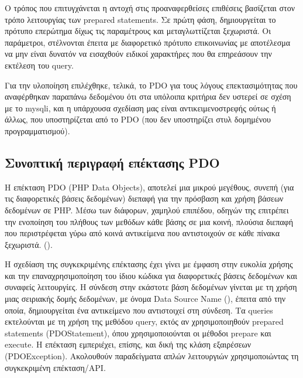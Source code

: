 \documentclass[diploma]{softlab-thesis}
\begin{document}
\bigskip

Ο τρόπος που επιτυγχάνεται η αντοχή στις προαναφερθείσες επιθέσεις βασίζεται
στον τρόπο λειτουργίας των prepared statements. Σε πρώτη φάση, δημιουργείται το
πρότυπο επερώτημα δίχως τις παραμέτρους και μεταγλωττίζεται ξεχωριστά. Οι
παράμετροι, στέλνονται έπειτα με διαφορετικό πρότυπο επικοινωνίας με
αποτέλεσμα να μην είναι δυνατόν να εισαχθούν ειδικοί χαρακτήρες που θα
επηρεάσουν την εκτέλεση του query.

\bigskip

Για την υλοποίηση επιλέχθηκε, τελικά, το PDO για τους λόγους επεκτασιμότητας
που αναφέρθηκαν παραπάνω δεδομένου ότι στα υπόλοιπα κριτήρια δεν υστερεί σε
σχέση με το mysqli, και η υπάρχουσα σχεδίαση μας είναι αντικειμενοστρεφής ούτως
ή άλλως, που υποστηρίζεται από το PDO (που δεν υποστηρίζει στυλ δομημένου
προγραμματισμού).

\subsection{Συνοπτική περιγραφή επέκτασης PDO}

Η επέκταση PDO (PHP Data Objects), αποτελεί μια μικρού μεγέθους, συνεπή (για
τις διαφορετικές βάσεις δεδομένων) διεπαφή για την πρόσβαση και χρήση βάσεων
δεδομένων σε PHP. Μέσω των διάφορων, χαμηλού επιπέδου, οδηγών της επιτρέπει την
ενοποίηση του πλήθους των μεθόδων κάθε βάσης σε μια κοινή, πλούσια διεπαφή που
περιστρέφεται γύρω από κοινά αντικείμενα που αντιστοιχούν σε κάθε πίνακα ξεχωριστά.
(\cite{pdo}).

\bigskip

Η σχεδίαση της συγκεκριμένης επέκτασης έχει γίνει με έμφαση στην ευκολία χρήσης
και την επαναχρησιμοποίηση του ίδιου κώδικα για διαφορετικές βάσεις δεδομένων
και συναφείς λειτουργίες. Η σύνδεση στην εκάστοτε βάση δεδομένων γίνεται με τη
χρήση μιας σειριακής δομής δεδομένων, με όνομα Data Source Name (\cite{dsn}),
έπειτα από την οποία, δημιουργείται ένα αντικείμενο που αντιστοιχεί στη
σύνδεση. Τα queries εκτελούνται με τη χρήση της μεθόδου query, εκτός αν
χρησιμοποιηθούν prepared statements (PDOStatement), όπου χρησιμοποιούνται οι
μέθοδοι prepare και execute. Η επέκταση εμπεριέχει, επίσης, και δική της κλάση
εξαιρέσεων (PDOException). Ακολουθούν παραδείγματα απλών λειτουργιών
χρησιμοποιώντας τη συγκεκριμένη επέκταση/API.

\bigskip

\FloatBarrier


\end{document}
